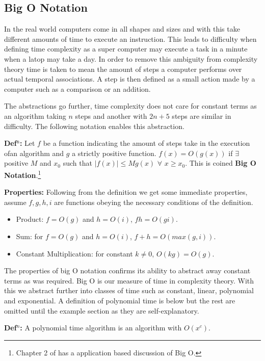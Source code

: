 \documentclass[a4paper,11pt]{report}
\begin{document}
\subsection{Big O Notation}

In the real world computers come in all shapes and sizes and with this take different amounts of time to execute an instruction. This leads to difficulty when defining time complexity as a super computer may execute a task in a minute when a latop may take a day. In order to remove this ambiguity from complexity theory time is taken to mean the amount of steps a computer performs over actual temporal associations. A step is then defined as a small action made by a computer such as a comparison or an addition. 

The abstractions go further, time complexity does not care for constant terms as an algorithm taking $n$ steps and another with $2n+5$ steps are similar in difficulty. The following notation enables this abstraction.

\textbf{Def$^\text{n}$:} Let $f$ be a function indicating the amount of steps take in the execution ofan algorithm and $g$ a strictly positive function. $f(x)=O (g(x))$ if $\exists$ positive $ M$ and $x_0$ such that $|f(x)|\leq Mg(x)$ $\forall$ $x\geq x_0$. This is coined \textbf{Big O Notation}.\footnote{Chapter 2 of \cite{salomaa1985computation} has a application based discussion of Big O.}

\textbf{Properties:} Following from the definition we get some immediate properties, assume $f,g,h,i$ are functions obeying the necessary conditions of the definition.
\begin{itemize}
\item Product: $f=O(g)$ and $h=O(i)$, $fh=O(gi)$.
\item Sum: for $f=O(g)$ and $h=O(i)$, $f+h = O(max(g,i))$.
\item Constant Multiplication: for constant $k\neq0$, $O(kg)=O(g)$.
\end{itemize}

The properties of big O notation confirms its ability to abstract away constant terms as was required. Big O is our measure of time in complexity theory. With this we abstract further into classes of time such as constant, linear, polynomial and exponential. A definition of polynomial time is below but the rest are omitted until the example section as they are self-explanatory.

\textbf{Def$^n$:} A polynomial time algorithm is an algorithm with $O(x^c)$.
\end{document}
